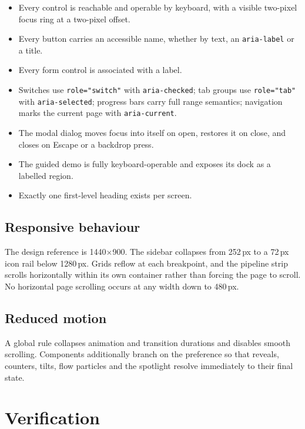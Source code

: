 \documentclass[11pt,a4paper]{report}
\newcommand{\code}[1]{\texttt{\small #1}}
\begin{document}
\begin{itemize}
  \item Every control is reachable and operable by keyboard, with a visible
    two-pixel focus ring at a two-pixel offset.
  \item Every button carries an accessible name, whether by text, an
    \code{aria-label} or a title.
  \item Every form control is associated with a label.
  \item Switches use \code{role="switch"} with \code{aria-checked}; tab groups
    use \code{role="tab"} with \code{aria-selected}; progress bars carry full
    range semantics; navigation marks the current page with
    \code{aria-current}.
  \item The modal dialog moves focus into itself on open, restores it on
    close, and closes on Escape or a backdrop press.
  \item The guided demo is fully keyboard-operable and exposes its dock as a
    labelled region.
  \item Exactly one first-level heading exists per screen.
\end{itemize}

\section{Responsive behaviour}

The design reference is 1440$\times$900. The sidebar collapses from 252\,px to
a 72\,px icon rail below 1280\,px. Grids reflow at each breakpoint, and the
pipeline strip scrolls horizontally within its own container rather than
forcing the page to scroll. No horizontal page scrolling occurs at any width
down to 480\,px.

\section{Reduced motion}

A global rule collapses animation and transition durations and disables smooth
scrolling. Components additionally branch on the preference so that reveals,
counters, tilts, flow particles and the spotlight resolve immediately to their
final state.

\chapter{Verification}
\label{ch:verification}
\end{document}
